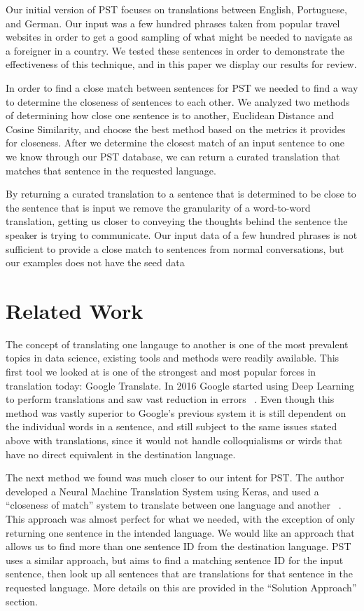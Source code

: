 \documentclass[runningheads]{llncs}
\begin{document}
	Our initial version of PST focuses on translations between English, Portuguese, and German. Our input was a few hundred phrases taken from popular travel websites in order to get a good sampling of what might be needed to navigate as a foreigner in a country. We tested these sentences in order to demonstrate the effectiveness of this technique, and in this paper we display our results for review. 

	In order to find a close match between sentences for PST we needed to find a way to determine the closeness of sentences to each other. We analyzed two  methods of determining how close one sentence is to another, Euclidean Distance and Cosine Similarity, and choose the best method based on the metrics it provides for closeness. After we determine the closest match of an input sentence to one we know through our PST database, we can return a curated translation that matches that sentence in the requested language.

	By returning a curated translation to a sentence that is determined to be close to the sentence that is input we remove the granularity of a word-to-word translation, getting us closer to conveying the thoughts behind the sentence the speaker is trying to communicate. Our input data of a few hundred phrases is not sufficient to provide a close match to sentences from normal conversations, but our examples does not have the seed data 
	
	\section{Related Work}
	The concept of translating one langauge to another is one of the most prevalent topics in data science, existing tools and methods were readily available. This first tool we looked at is one of the strongest and most popular forces in translation today: Google Translate. In 2016 Google started using Deep Learning  to perform translations and saw vast reduction in errors ~\cite{ref_url18}. Even though this method was vastly superior to Google's previous system it is still dependent on the individual words in a sentence, and still subject to the same issues stated above with translations, since it would not handle colloquialisms or wirds that have no direct equivalent in the destination language. 

	The next method we found was much closer to our intent for PST. The author developed a Neural Machine Translation System using Keras, and used a ``closeness of match'' system to translate between one language and another ~\cite{ref_url16}. This approach was almost perfect for what we needed, with the exception of only returning one sentence in the intended language. We would like an approach that allows us to find more than one sentence ID from the destination language. PST uses a similar approach, but aims to find a matching sentence ID for the input sentence, then look up all sentences that are translations for that sentence in the requested language. More details on this are provided in the ``Solution Approach'' section.
	
\end{document}

